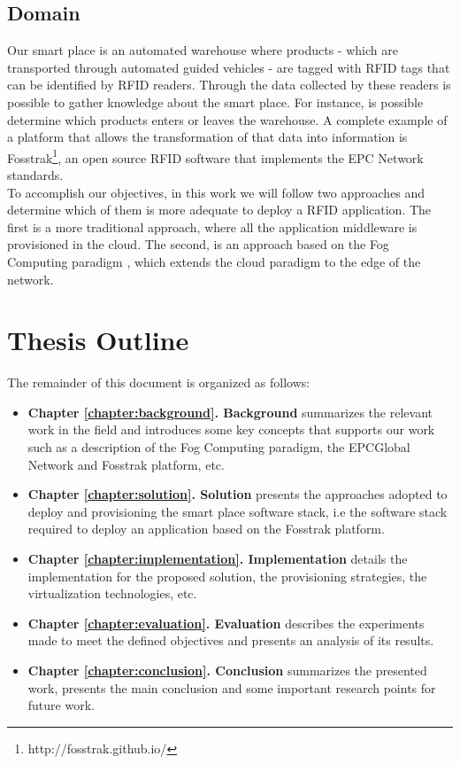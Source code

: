 \subsection{Domain}
\label{sub:domain}
Our smart place is an automated warehouse where products - which are transported through automated
guided vehicles - are tagged with \gls{RFID} tags that can be identified by \gls{RFID} readers.
Through the data collected by these readers is possible to gather knowledge about the smart place.
For instance, is possible determine which products enters or leaves the warehouse. A complete example
of a platform that allows the transformation of that data into information is Fosstrak\footnote{http://fosstrak.github.io/},
an open source \gls{RFID} software that implements the \gls{EPC} Network standards.\\

To accomplish our objectives, in this work we will follow two approaches and determine which of them
is more adequate to deploy a \gls{RFID} application. The first is a more traditional approach, where
all the application middleware is provisioned in the cloud. The second, is an approach based on the
Fog Computing paradigm \cite{bonomi2012fog}, which extends the cloud paradigm to the edge of the
network.

\section{Thesis Outline}
\label{section:outline}
The remainder of this document is organized as follows:
\begin{itemize}
  \item \textbf{Chapter \ref{chapter:background}. Background} summarizes the relevant work in the field and
  introduces some key concepts that supports our work such as a description of the Fog Computing paradigm,
  the EPCGlobal Network and Fosstrak platform, etc.
  \item \textbf{Chapter \ref{chapter:solution}. Solution} presents the approaches adopted to deploy
  and provisioning the smart place software stack, i.e the software stack required to deploy
  an application based on the Fosstrak platform.
  \item \textbf{Chapter \ref{chapter:implementation}. Implementation} details the implementation
  for the proposed solution, the provisioning strategies, the virtualization technologies, etc.
  \item \textbf{Chapter \ref{chapter:evaluation}. Evaluation} describes the experiments made to meet
  the defined objectives and presents an analysis of its results.
  \item \textbf{Chapter \ref{chapter:conclusion}. Conclusion} summarizes the presented work,
  presents the main conclusion and some important research points for future work.
\end{itemize}
